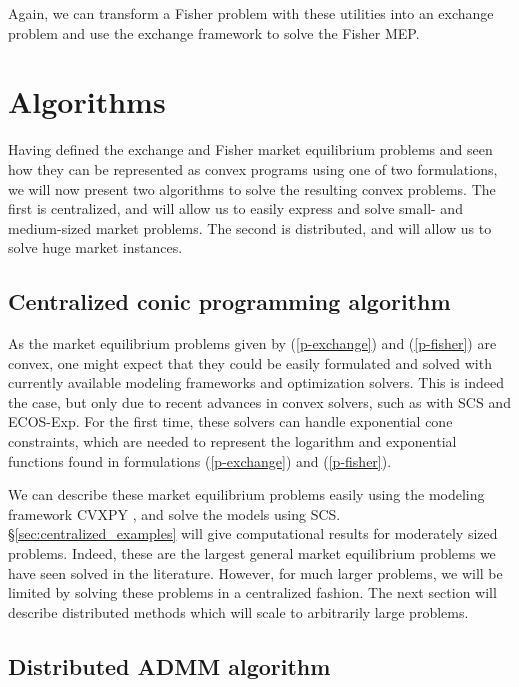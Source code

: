 \documentclass[12pt]{article}
\begin{document}
Again, we can transform a Fisher problem with these utilities into
an exchange problem and use the exchange framework to solve
the Fisher MEP.

\section{Algorithms}

Having defined the exchange and Fisher market equilibrium problems and seen how
they can be represented as convex programs using one of two formulations, we
will now present two algorithms to solve the resulting convex problems. The
first is centralized, and will allow us to easily express and solve small- and
medium-sized market problems. The second is distributed, and will allow us to
solve huge market instances.

\label{sec:algorithms}
\subsection{Centralized conic programming algorithm}
\label{sec:centralized}

As the market equilibrium problems given by (\ref{p-exchange}) and
(\ref{p-fisher}) are convex, one might expect that they could be easily
formulated and solved with currently available modeling frameworks and
optimization solvers. This is indeed the case, but only due to recent advances
in convex solvers, such as with SCS \cite{scs} and ECOS-Exp. %
For the first time, these solvers can handle exponential cone constraints,
which are needed to represent the logarithm and exponential functions found in
formulations (\ref{p-exchange}) and (\ref{p-fisher}).

We can describe these market equilibrium problems easily using the modeling
framework CVXPY \cite{cvxpy}, and solve the models using SCS.
\S\ref{sec:centralized_examples} will give computational results for moderately
sized problems. Indeed, these are the largest general market equilibrium
problems we have seen solved in the literature. However, for much larger
problems, we will be limited by solving these problems in a centralized
fashion. The next section will describe distributed methods which will scale to
arbitrarily large problems.


\subsection{Distributed ADMM algorithm}
\label{sec:distributed}
\end{document}
